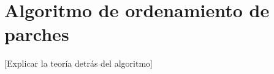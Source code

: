 \chapter{Algoritmo de ordenamiento de parches}\label{chapter:PRA} %
[Explicar la teoría detrás del algoritmo]


%	


